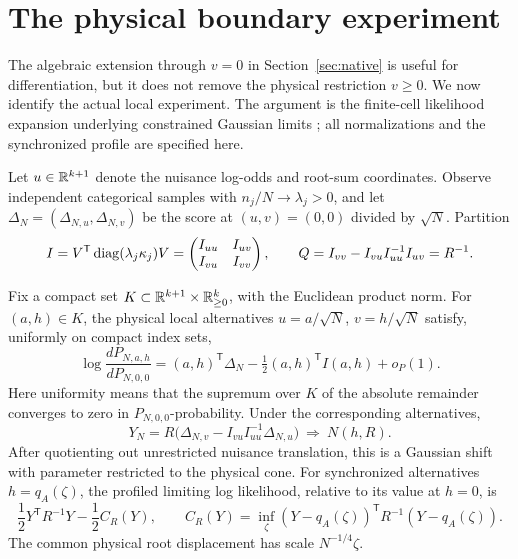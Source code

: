 \section{The physical boundary experiment}\label{sec:boundary}
The algebraic extension through $v=0$ in Section~\ref{sec:native} is useful for differentiation, but it does not remove the physical restriction $v\ge0$. We now identify the actual local experiment. The argument is the finite-cell likelihood expansion underlying constrained Gaussian limits \cite{Geyer,vdV}; all normalizations and the synchronized profile are specified here.

Let $u\in\mathbb R^{k+1}$ denote the nuisance log-odds and root-sum coordinates. Observe independent categorical samples with $n_j/N\to\lambda_j>0$, and let $\Delta_N=(\Delta_{N,u},\Delta_{N,v})$ be the score at $(u,v)=(0,0)$ divided by $\sqrt N$. Partition
\[
 I=V^{\mathsf T}\operatorname{diag}(\lambda_j\kappa_j)V
   =\begin{pmatrix}I_{uu}&I_{uv}\\I_{vu}&I_{vv}\end{pmatrix},
 \qquad Q=I_{vv}-I_{vu}I_{uu}^{-1}I_{uv}=R^{-1}.
\]
\begin{theorem}\label{thm:boundary}
Fix a compact set $K\subset\mathbb R^{k+1}\times\mathbb R^k_{\ge0}$, with the Euclidean product norm. For $(a,h)\in K$, the physical local alternatives $u=a/\sqrt N$, $v=h/\sqrt N$ satisfy, uniformly on compact index sets,
\begin{equation}\label{eq:LAN}
 \log\frac{dP_{N,a,h}}{dP_{N,0,0}}
  =(a,h)^{\mathsf T}\Delta_N-\tfrac12(a,h)^{\mathsf T}I(a,h)+o_P(1).
\end{equation}
Here uniformity means that the supremum over $K$ of the absolute remainder converges to zero in $P_{N,0,0}$-probability. Under the corresponding alternatives,
\begin{equation}\label{eq:efficient-Y}
 Y_N=R\bigl(\Delta_{N,v}-I_{vu}I_{uu}^{-1}\Delta_{N,u}\bigr)
          \ \Longrightarrow\ N(h,R).
\end{equation}
After quotienting out unrestricted nuisance translation, this is a Gaussian shift with parameter restricted to the physical cone. For synchronized alternatives $h=q_A(\zeta)$, the profiled limiting log likelihood, relative to its value at $h=0$, is
\begin{equation}\label{eq:profile-limit}
 \frac12Y^{\mathsf T}R^{-1}Y-\frac12C_R(Y),\qquad
 C_R(Y)=\inf_\zeta(Y-q_A(\zeta))^{\mathsf T}R^{-1}(Y-q_A(\zeta)).
\end{equation}
The common physical root displacement has scale $N^{-1/4}\zeta$.
\end{theorem}
